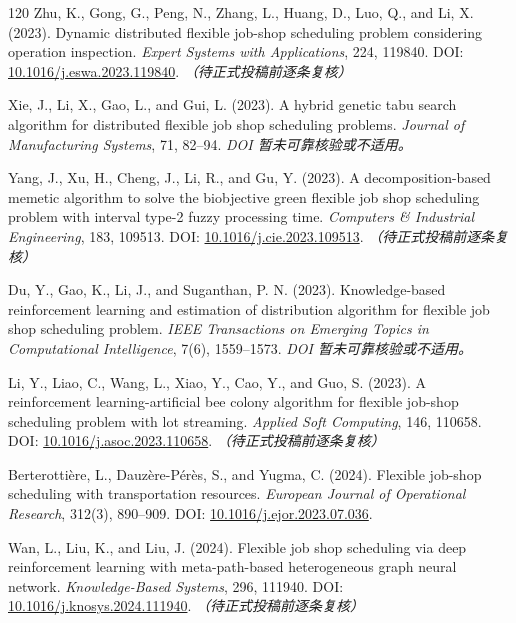 \documentclass[UTF8,a4paper,11pt]{ctexart}
\begin{document}
\begin{thebibliography}{120}
Zhu, K., Gong, G., Peng, N., Zhang, L., Huang, D., Luo, Q., and Li, X. (2023). Dynamic distributed flexible job-shop scheduling problem considering operation inspection. \emph{Expert Systems with Applications}, 224, 119840.
\newblock DOI: \href{https://doi.org/10.1016/j.eswa.2023.119840}{10.1016/j.eswa.2023.119840}. \textit{（待正式投稿前逐条复核）}

Xie, J., Li, X., Gao, L., and Gui, L. (2023). A hybrid genetic tabu search algorithm for distributed flexible job shop scheduling problems. \emph{Journal of Manufacturing Systems}, 71, 82--94.
\newblock \textit{DOI 暂未可靠核验或不适用。}

Yang, J., Xu, H., Cheng, J., Li, R., and Gu, Y. (2023). A decomposition-based memetic algorithm to solve the biobjective green flexible job shop scheduling problem with interval type-2 fuzzy processing time. \emph{Computers \& Industrial Engineering}, 183, 109513.
\newblock DOI: \href{https://doi.org/10.1016/j.cie.2023.109513}{10.1016/j.cie.2023.109513}. \textit{（待正式投稿前逐条复核）}

Du, Y., Gao, K., Li, J., and Suganthan, P. N. (2023). Knowledge-based reinforcement learning and estimation of distribution algorithm for flexible job shop scheduling problem. \emph{IEEE Transactions on Emerging Topics in Computational Intelligence}, 7(6), 1559--1573.
\newblock \textit{DOI 暂未可靠核验或不适用。}

Li, Y., Liao, C., Wang, L., Xiao, Y., Cao, Y., and Guo, S. (2023). A reinforcement learning-artificial bee colony algorithm for flexible job-shop scheduling problem with lot streaming. \emph{Applied Soft Computing}, 146, 110658.
\newblock DOI: \href{https://doi.org/10.1016/j.asoc.2023.110658}{10.1016/j.asoc.2023.110658}. \textit{（待正式投稿前逐条复核）}

Berterotti\`ere, L., Dauz\`ere-P\'er\`es, S., and Yugma, C. (2024). Flexible job-shop scheduling with transportation resources. \emph{European Journal of Operational Research}, 312(3), 890--909.
\newblock DOI: \href{https://doi.org/10.1016/j.ejor.2023.07.036}{10.1016/j.ejor.2023.07.036}.

Wan, L., Liu, K., and Liu, J. (2024). Flexible job shop scheduling via deep reinforcement learning with meta-path-based heterogeneous graph neural network. \emph{Knowledge-Based Systems}, 296, 111940.
\newblock DOI: \href{https://doi.org/10.1016/j.knosys.2024.111940}{10.1016/j.knosys.2024.111940}. \textit{（待正式投稿前逐条复核）}


\end{thebibliography}
\end{document}
